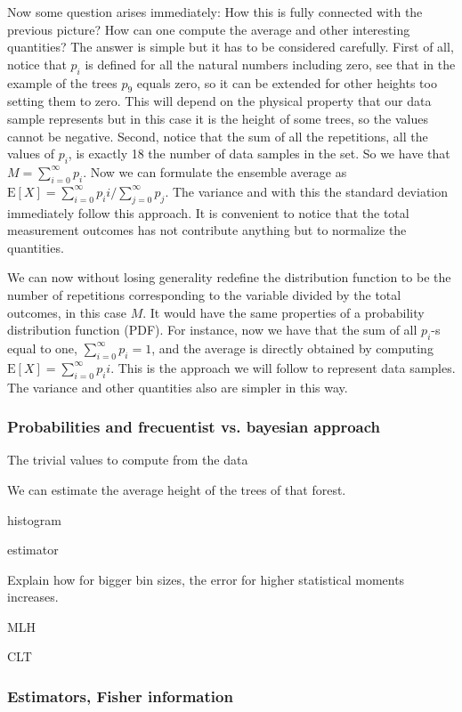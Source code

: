 Now some question arises immediately:
How this is fully connected with the previous picture?
How can one compute the average and other interesting quantities?
The answer is simple but it has to be considered carefully.
First of all, notice that $p_i$ is defined for all the natural numbers including zero, see that in the example of the trees $p_9$ equals zero, so it can be extended for other heights too setting them to zero.
This will depend on the physical property that our data sample represents but in this case it is the height of some trees, so the values cannot be negative.
Second, notice that the sum of all the repetitions, all the values of $p_i$, is exactly 18 the number of data samples in the set.
So we have that $M = \sum_{i=0}^{\infty} p_i$.
Now we can formulate the ensemble average as $\text{E}[X]=\sum_{i=0}^{\infty} p_i i / \sum_{j=0}^{\infty} p_j$. The variance and with this the standard deviation immediately follow this approach.
It is convenient to notice that the total measurement outcomes has not contribute anything but to normalize the quantities.

We can now without losing generality redefine the distribution function to be the number of repetitions corresponding to the variable divided by the total outcomes, in this case $M$.
It would have the same properties of a probability distribution function (PDF).
For instance, now we have that the sum of all $p_i$-s equal to one, $\sum_{i=0}^\infty p_i = 1$, and the average is directly obtained by computing  $\text{E}[X] = \sum_{i=0}^\infty p_i i$.
This is the approach we will follow to represent data samples.
The variance and other quantities also are simpler in this way.

\subsubsection{Probabilities and frecuentist vs. bayesian approach}

The trivial values to compute from the data

We can estimate the average height of the trees of that forest.

histogram

estimator

Explain how for bigger bin sizes, the error for higher statistical moments increases.

MLH

CLT

\subsubsection{Estimators, Fisher information}

